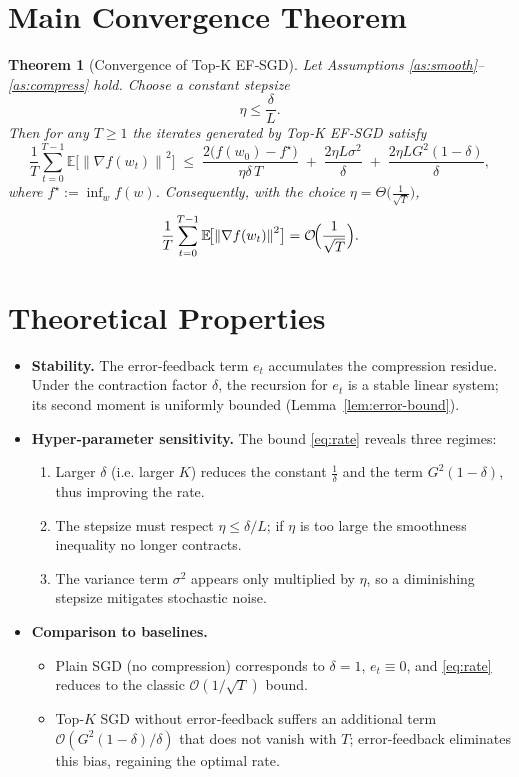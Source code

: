 \documentclass{article}
\newtheorem{theorem}{Theorem}
\newcommand{\E}{\mathbb{E}}
\newcommand{\norm}[1]{\left\lVert #1\right\rVert}
\begin{document}
\section*{Main Convergence Theorem}
\begin{theorem}[Convergence of Top‑K EF‑SGD]\label{thm:main}
Let Assumptions \ref{as:smooth}–\ref{as:compress} hold.
Choose a constant stepsize
\[
\eta\le \frac{\delta}{L}.
\]
Then for any $T\ge1$ the iterates generated by Top‑K EF‑SGD satisfy
\begin{equation}
\label{eq:rate}
\frac{1}{T}\sum_{t=0}^{T-1}\E\!\bigl[\norm{\nabla f(w_t)}^2\bigr]
\;\le\;
\frac{2\bigl(f(w_0)-f^\star\bigr)}{\eta\delta\,T}
\;+\;
\frac{2\eta L\sigma^2}{\delta}
\;+\;
\frac{2\eta L G^2(1-\delta)}{\delta},
\end{equation}
where $f^\star:=\inf_{w}f(w)$.
Consequently, with the choice $\eta = \Theta\!\bigl(\frac{1}{\sqrt{T}}\bigr)$,
\[
\frac{1}{T}\sum_{t=0}^{T-1}\E\!\bigl[\norm{\nabla f(w_t)}^2\bigr]=\mathcal{O}\!\Bigl(\frac{1}{\sqrt{T}}\Bigr).
\]
\end{theorem}

\section*{Theoretical Properties}
\begin{itemize}
\item \textbf{Stability.} The error‑feedback term $e_t$ accumulates the compression residue. Under the contraction factor $\delta$, the recursion for $e_t$ is a stable linear system; its second moment is uniformly bounded (Lemma~\ref{lem:error-bound}).
\item \textbf{Hyper‑parameter sensitivity.} The bound \eqref{eq:rate} reveals three regimes:
    \begin{enumerate}
        \item Larger $\delta$ (i.e. larger $K$) reduces the constant $\frac{1}{\delta}$ and the term $G^2(1-\delta)$, thus improving the rate.
        \item The stepsize must respect $\eta\le\delta/L$; if $\eta$ is too large the smoothness inequality no longer contracts.
        \item The variance term $\sigma^2$ appears only multiplied by $\eta$, so a diminishing stepsize mitigates stochastic noise.
    \end{enumerate}
\item \textbf{Comparison to baselines.}
    \begin{itemize}
        \item Plain SGD (no compression) corresponds to $\delta=1$, $e_t\equiv0$, and \eqref{eq:rate} reduces to the classic $\mathcal{O}(1/\sqrt{T})$ bound.
        \item Top‑$K$ SGD without error‑feedback suffers an additional term $\mathcal{O}(G^2(1-\delta)/\delta)$ that does not vanish with $T$; error‑feedback eliminates this bias, regaining the optimal rate.
    \end{itemize}
\end{itemize}
\end{document}
